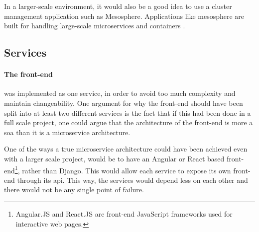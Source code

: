 In a larger-scale environment, it would also be a good idea to use a cluster management application such as Mesosphere. Applications like mesosphere are built for handling large-scale microservices and containers \citep{digitalOceanMesosphere}.

\subsection{Services}
\paragraph{The front-end} was implemented as one service, in order to avoid too much complexity and maintain changeability.
One argument for why the front-end should have been split into at least two different services is the fact that if this had been done in a full scale project, one could argue that the architecture of the front-end is more a \acrshort{soa} than it is a microservice architecture.

One of the ways a true microservice architecture could have been achieved even with a larger scale project, would be to have an Angular or React based front-end\footnote{Angular.JS and React.JS are front-end JavaScript frameworks used for interactive web pages.}, rather than Django. This would allow each service to expose its own front-end through its \acrshort{api}. This way, the services would depend less on each other and there would not be any single point of failure.